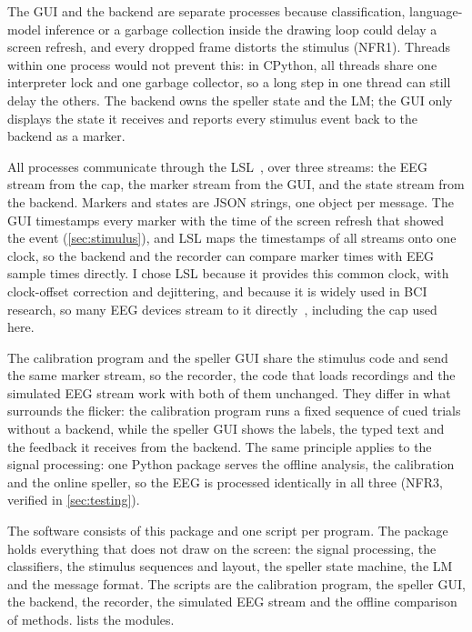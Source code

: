 The \ac{GUI} and the backend are separate processes because classification,
language-model inference or a garbage collection inside the drawing loop could delay a
screen refresh, and every dropped frame distorts the stimulus (NFR1). Threads within
one process would not prevent this: in CPython, all threads share one interpreter lock
and one garbage collector, so a long step in one thread can still delay the others.
The backend owns the speller state and the \ac{LM}; the \ac{GUI} only displays the
state it receives and reports every stimulus event back to the backend as a marker.

All processes communicate through the \ac{LSL}~\citep{kothe2025lsl}, over three
streams: the \ac{EEG} stream from the cap, the marker stream from the \ac{GUI}, and the
state stream from the backend. Markers and states are \ac{JSON} strings, one object per
message. The \ac{GUI} timestamps every marker with the time of the screen refresh that
showed the event (\cref{sec:stimulus}), and \ac{LSL} maps the timestamps of all streams
onto one clock, so the backend and the recorder can compare marker times with \ac{EEG}
sample times directly.
I chose \ac{LSL} because it provides this common clock, with clock-offset correction and
dejittering, and because it is widely used in \ac{BCI} research, so many \ac{EEG}
devices stream to it directly~\citep{kothe2025lsl}, including the cap used here.

The calibration program and the speller \ac{GUI} share the stimulus code and send the
same marker stream, so the recorder, the code that loads recordings and the simulated
\ac{EEG} stream work with both of them unchanged. They differ in what surrounds the
flicker: the calibration program runs a fixed sequence of cued trials without a
backend, while the speller \ac{GUI} shows the labels, the typed text and the feedback it
receives from the backend.
The same principle applies to the signal processing: one Python package serves the
offline analysis, the calibration and the online speller, so the \ac{EEG} is processed
identically in all three (NFR3, verified in \cref{sec:testing}).

The software consists of this package and one script per program. The package holds
everything that does not draw on the screen: the signal processing, the classifiers, the
stimulus sequences and layout, the speller state machine, the \ac{LM} and the message
format. The scripts are the calibration program, the speller \ac{GUI}, the backend, the
recorder, the simulated \ac{EEG} stream and the offline comparison of methods.
 lists the modules.



